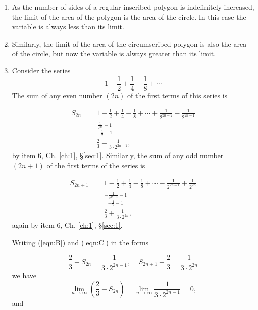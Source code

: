 \begin{enumerate}
\item
As the number of sides of a regular inscribed polygon is 
indefinitely increased, the limit of the area of the polygon 
is the area of the circle. In this case the variable is always 
less than its limit.

\item
Similarly, the limit of the area of the circumscribed polygon 
is also the area of the circle, but now the variable is 
always greater than its limit.

\item
Consider the series
\begin{equation}
1 - \frac{1}{2} + \frac{1}{4} - \frac{1}{8} + \cdots
\label{eqn:A}
\end{equation}
The sum of any even number $(2n)$ of the first terms of this series is

\begin{equation}
\begin{array}{ll}
 S_{2n}	&= 1 - \frac{1}{2} + \frac{1}{4} - \frac{1}{8} + \cdots 
+ \frac{1}{2^{2n - 2}} - \frac{1}{2^{2n - 1}}\\
&= \frac{\frac{1}{2^{2n}} - 1}{-\frac{1}{2} - 1} \\
&= \frac{2}{3} - \frac{1}{3 \cdot 2^{2n - 1}},
\end{array}
\label{eqn:B}
\end{equation}
by item 6, Ch. \ref{ch:1}, \S \ref{sec:1}.
Similarly, the sum of any odd number $(2n + 1)$ of the first terms of 
the series is

\begin{equation}
\begin{array}{ll}
S_{2n + 1} 	&
= 1 - \frac{1}{2} + \frac{1}{4} - \frac{1}{8} + 
\cdots - \frac{1}{2^{2n - 1}} + \frac{1}{2^{2n}}\\
&= \frac{-\frac{1}{2^{2n + 1}} - 1}{-\frac{1}{2} - 1} \\
&= \frac{2}{3} + \frac{1}{3 \cdot 2^{2n}},
\end{array}
\label{eqn:C}
\end{equation}
again by item 6, Ch. \ref{ch:1}, \S \ref{sec:1}.

Writing (\ref{eqn:B}) and (\ref{eqn:C}) in the forms

\[
 \frac{2}{3} - S_{2n} 
= \frac{1}{3 \cdot 2^{2n - 1}}, 
\ \ \ \ \ S_{2n + 1} - \frac{2}{3} 
= \frac{1}{3 \cdot 2^{2n}}
\]
we have 
\[
\lim_{n \to \infty} \left ( \frac{2}{3} - S_{2n} \right ) 	
= \lim_{n \to \infty} \frac{1}{3 \cdot 2^{2n - 1}} = 0,
\]
and 


\end{enumerate}
